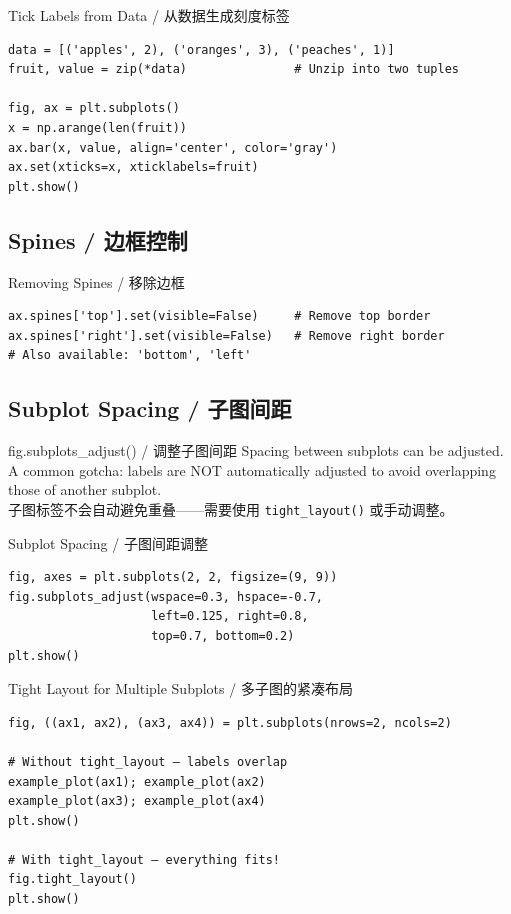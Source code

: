 \documentclass[11pt,a4paper]{article}
\begin{document}
\begin{examplebox}{Tick Labels from Data / 从数据生成刻度标签}
\begin{lstlisting}
data = [('apples', 2), ('oranges', 3), ('peaches', 1)]
fruit, value = zip(*data)               # Unzip into two tuples

fig, ax = plt.subplots()
x = np.arange(len(fruit))
ax.bar(x, value, align='center', color='gray')
ax.set(xticks=x, xticklabels=fruit)
plt.show()
\end{lstlisting}
\end{examplebox}

\subsection{Spines / 边框控制}

\begin{examplebox}{Removing Spines / 移除边框}
\begin{lstlisting}
ax.spines['top'].set(visible=False)     # Remove top border
ax.spines['right'].set(visible=False)   # Remove right border
# Also available: 'bottom', 'left'
\end{lstlisting}
\end{examplebox}

\subsection{Subplot Spacing / 子图间距}

\begin{concept}{fig.subplots\_adjust() / 调整子图间距}
    Spacing between subplots can be adjusted. A common gotcha: labels are NOT automatically adjusted to avoid overlapping those of another subplot. \\
    子图标签不会自动避免重叠——需要使用 \texttt{tight\_layout()} 或手动调整。
\end{concept}

\begin{examplebox}{Subplot Spacing / 子图间距调整}
\begin{lstlisting}
fig, axes = plt.subplots(2, 2, figsize=(9, 9))
fig.subplots_adjust(wspace=0.3, hspace=-0.7,
                    left=0.125, right=0.8,
                    top=0.7, bottom=0.2)
plt.show()
\end{lstlisting}
\end{examplebox}

\begin{examplebox}{Tight Layout for Multiple Subplots / 多子图的紧凑布局}
\begin{lstlisting}
fig, ((ax1, ax2), (ax3, ax4)) = plt.subplots(nrows=2, ncols=2)

# Without tight_layout — labels overlap
example_plot(ax1); example_plot(ax2)
example_plot(ax3); example_plot(ax4)
plt.show()

# With tight_layout — everything fits!
fig.tight_layout()
plt.show()
\end{lstlisting}
\end{examplebox}
\end{document}
